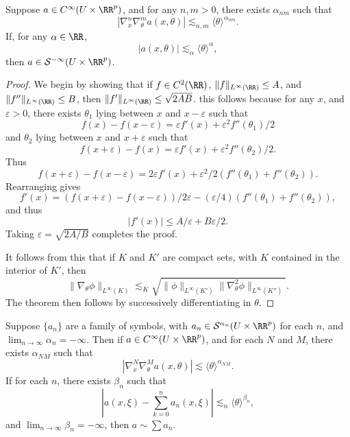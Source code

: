 \begin{lemma}
    Suppose $a \in C^\infty(U \times \RR^p)$, and for any $n,m > 0$, there exists $\alpha_{nm}$ such that
    \[ |\nabla^n_x \nabla^m_\theta a(x,\theta)| \lesssim_{n,m} \langle \theta \rangle^{\alpha_{nm}}. \]
    If, for any $\alpha \in \RR$,
    \[ |a(x,\theta)| \lesssim_\alpha \langle \theta \rangle^\alpha, \]
    then $a \in \mathcal{S}^{-\infty}(U \times \RR^p)$.
\end{lemma}
\begin{proof}
    We begin by showing that if $f \in C^2(\RR)$, $\| f \|_{L^\infty(\RR)} \leq A$, and $\| f'' \|_{L^\infty(\RR)} \leq B$, then $\| f' \|_{L^\infty(\RR)} \leq \sqrt{2AB}$. this follows because for any $x$, and $\varepsilon > 0$, there exists $\theta_1$ lying between $x$ and $x - \varepsilon$ such that
    \[ f(x) - f(x-\varepsilon) = \varepsilon f'(x) + \varepsilon^2 f''(\theta_1) / 2 \]
    and $\theta_2$ lying between $x$ and $x + \varepsilon$ such that
    \[ f(x + \varepsilon) - f(x) = \varepsilon f'(x) + \varepsilon^2 f''(\theta_2)/2. \]
    Thus
    \[ f(x+\varepsilon) - f(x-\varepsilon) = 2 \varepsilon f'(x) + \varepsilon^2 / 2 (f''(\theta_1) + f''(\theta_2)). \]
    Rearranging gives
    \[ f'(x) = (f(x+\varepsilon) - f(x-\varepsilon))/2 \varepsilon - (\varepsilon / 4)(f''(\theta_1) + f''(\theta_2)), \]
    and thus
    \[ |f'(x)| \leq A/\varepsilon + B \varepsilon / 2. \]
    Taking $\varepsilon = \sqrt{2A/B}$ completes the proof.

    It follows from this that if $K$ and $K'$ are compact sets, with $K$ contained in the interior of $K'$, then
    \[ \| \nabla_\theta \phi \|_{L^\infty(K)} \lesssim_K \sqrt{\| \phi \|_{L^\infty(K')} \| \nabla_\theta^2 \phi \|_{L^\infty(K'')} }. \]
    The theorem then follows by successively differentiating in $\theta$.
\end{proof}

\begin{corollary}
    Suppose $\{ a_n \}$ are a family of symbols, with $a_n \in \mathcal{S}^{\alpha_n}(U \times \RR^p)$ for each $n$, and $\lim_{n \to \infty} \alpha_n = -\infty$. Then if $a \in C^\infty(U \times \RR^p)$, and for each $N$ and $M$, there exists $\alpha_{NM}$ such that
    \[ |\nabla^N_x \nabla^M_\theta a(x,\theta)| \lesssim \langle \theta \rangle^{\alpha_{NM}}. \]
    If for each $n$, there exists $\beta_n$ such that
    \[ |a(x,\xi) - \sum_{k = 0}^n a_n(x,\xi)| \lesssim_n \langle \theta \rangle^{\beta_n}, \]
    and $\lim_{n \to \infty} \beta_n = -\infty$, then $a \sim \sum a_n$.
\end{corollary}

